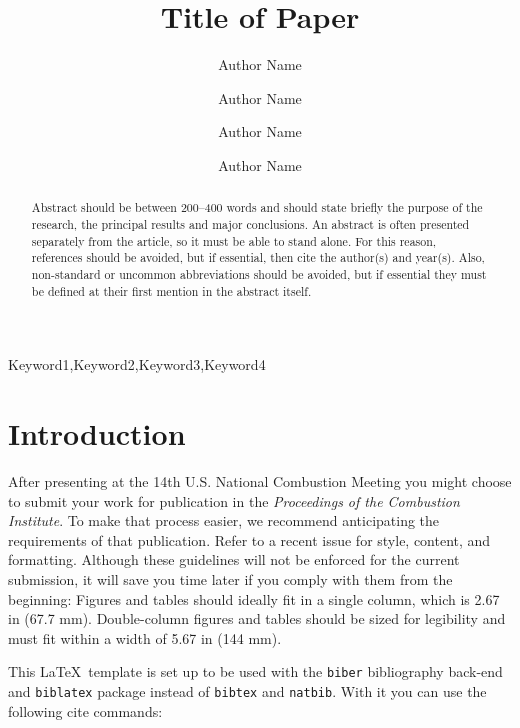 \documentclass[12pt]{ussci}
\title{ Title of Paper }
\author[1]{Author Name}
\author[1]{Author Name}
\author[2]{Author Name}
\author[2,*]{Author Name}
\affil[1]{Department, Institution, Address, Country}
\affil[2]{Department, Institution, Address, Country}
\affil[*]{Corresponding author: \email{author@university.edu}}
\begin{document}
\maketitle

\begin{abstract} %
Abstract should be between 200--400 words and should state briefly the purpose
of the research, the principal results and major conclusions. An abstract is
often presented separately from the article, so it must be able to stand alone.
For this reason, references should be avoided, but if essential, then cite the
author(s) and year(s). Also, non-standard or uncommon abbreviations should be
avoided, but if essential they must be defined at their first mention in the
abstract itself.
\end{abstract}

\begin{keyword}
    Keyword1\sep Keyword2\sep Keyword3\sep Keyword4
\end{keyword}

\section{Introduction}

After presenting at the 14th U.S. National Combustion Meeting you might choose to submit your work for publication in the {\em Proceedings of the Combustion Institute}. 
To make that process easier, we recommend anticipating the requirements of that publication. Refer to a recent issue for style, content, and formatting. 
Although these guidelines will not be enforced for the current submission, it will save you time later if you comply with them from the beginning: 
Figures and tables should ideally fit in a single column, which is 2.67 in (67.7 mm).  
Double-column figures and tables should be sized for legibility and must fit within a width of 5.67 in (144 mm). 

This \LaTeX\ template is set up to be used with the {\tt biber} bibliography back-end and {\tt biblatex} package instead of {\tt bibtex} and {\tt natbib}.
With it you can use the following cite commands:
\end{document}
